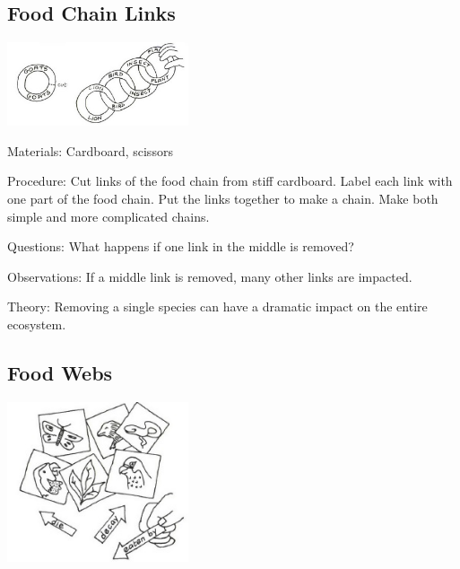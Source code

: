 \begin{multicols}{2}
\subsection{Food Chain Links} %

\begin{center}
\includegraphics[width=0.4\textwidth]{./img/vso/food-chain-links.jpg}
\end{center}

\begin{description*}
\item[Materials:]{Cardboard, scissors}
\item[Procedure:]{Cut links of the food chain from
stiff cardboard. Label each link
with one part of the food chain.
Put the links together to make a
chain. Make both simple and more complicated chains.}
\item[Questions:]{What happens if one link in the middle is removed?}
\item[Observations:]{If a middle link is removed, many other links are impacted.}
\item[Theory:]{Removing a single species can have a dramatic impact on the entire ecosystem.}
\end{description*}

\subsection{Food Webs} %

\begin{center}
\includegraphics[width=0.4\textwidth]{./img/vso/food-webs.jpg}
\end{center}


\end{multicols}
